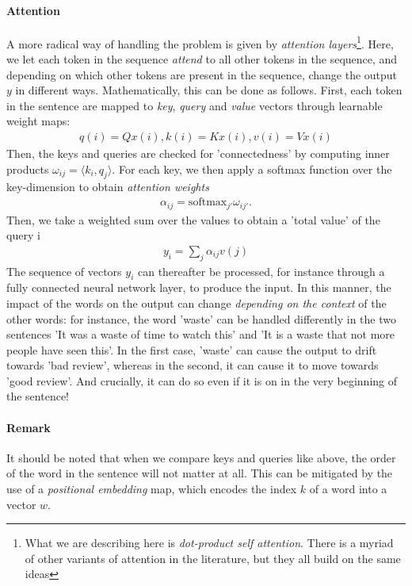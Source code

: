 \documentclass{article}
\newcommand{\sprod}[1]{\langle #1 \rangle}
\newcommand{\softmax}{\mathrm{softmax}}
\begin{document}
\paragraph{Attention} A more radical way of handling the problem is given by \emph{attention layers}\footnote{What we are describing here is \emph{dot-product self attention}. There is a myriad of other variants of attention in the literature, but they all build on the same ideas}. Here, we let each token in the sequence \emph{attend} to all other tokens in the sequence, and depending on which other tokens are present in the sequence, change the output $y$ in different ways. Mathematically, this can be done as follows. First, each token in the sentence are mapped to \emph{key}, \emph{query}  and \emph{value} vectors through learnable weight maps:
\begin{align*}
    q(i) = Qx(i), k(i) = Kx(i), v(i) = Vx(i)
\end{align*}
Then, the keys and queries are checked for 'connectedness' by computing inner products $\omega_{ij} = \sprod{k_i,q_j}$. For each key, we then apply a softmax function over the key-dimension to obtain \emph{attention weights}
\begin{align*}
    \alpha_{ij} = \softmax_{j'} \omega_{ij'}.
\end{align*}
Then, we take a weighted sum over the values to obtain a 'total value' of the query i
\begin{align*}
    y_i  = \sum_{j} \alpha_{ij} v(j)
\end{align*}
The sequence of vectors $y_i$ can thereafter be processed, for instance through a fully connected neural network layer, to produce the input.
In this manner, the impact of the words on the output can change \emph{depending on the context} of the other words: for instance, the word 'waste' can be handled differently in the two sentences 'It was a waste of time to watch this' and 'It is a waste that not more people have seen this'. In the first case, 'waste' can cause the output to drift towards 'bad review', whereas in the second, it can cause it to move towards 'good review'. And crucially, it can do so even if it is on in the very beginning of the sentence!

\paragraph{Remark} It should be noted that when we compare keys and queries like above, the order of the word in the sentence will not matter at all. This can be mitigated by the use of a \emph{positional embedding} map, which encodes the index $k$ of a word into a vector $w$. \newline
\end{document}
